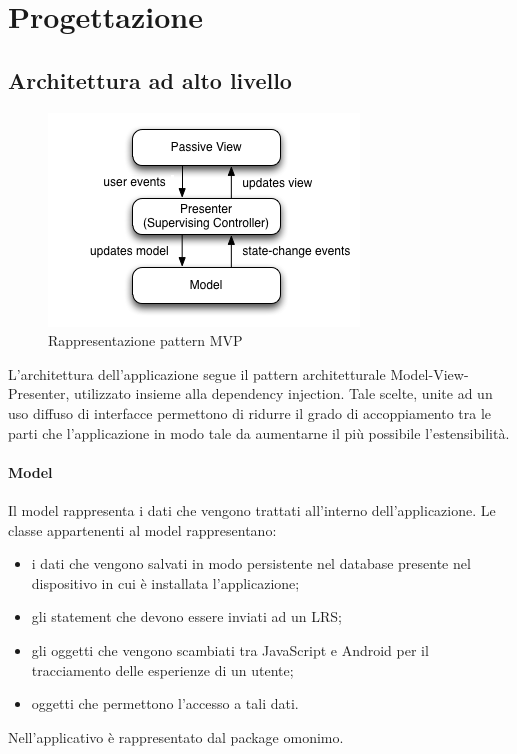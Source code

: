 \documentclass[../Tesi.tex]{subfiles}
\begin{document}
\section{Progettazione}
	\subsection{Architettura ad alto livello}
		\begin{figure}[!h]
			\centering
			\includegraphics[scale=0.6]{images/mvp}
				\caption{Rappresentazione pattern MVP}
			\label{fig:StrutturaMVP}
		\end{figure}

		L'architettura dell'applicazione segue il pattern architetturale Model-View-Presenter, utilizzato insieme alla dependency injection. Tale scelte, unite ad un uso diffuso di interfacce permettono di ridurre il grado di accoppiamento tra le parti che l'applicazione in modo tale da aumentarne il più possibile l'estensibilità.

		\paragraph*{Model}
		Il model rappresenta i dati che vengono trattati all'interno dell'applicazione. Le classe appartenenti al model rappresentano:
		\begin{itemize}
			\item i dati che vengono salvati in modo persistente nel database presente nel dispositivo in cui è installata l'applicazione;
			\item gli statement che devono essere inviati ad un LRS;
			\item gli oggetti che vengono scambiati tra JavaScript e Android per il tracciamento delle esperienze di un utente;
			\item oggetti che permettono l'accesso a tali dati.
		\end{itemize}
		Nell'applicativo è rappresentato dal package omonimo.
\end{document}
